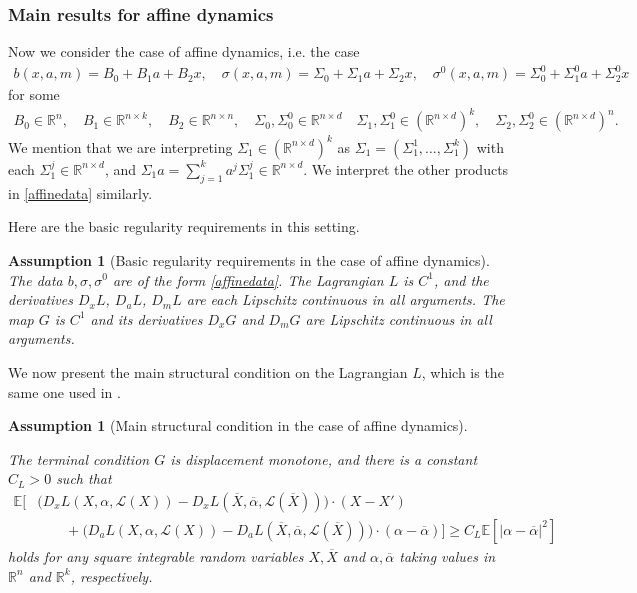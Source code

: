 \documentclass[11pt,reqno]{amsart}
\numberwithin{equation}{section}
\newtheorem{assumption}[theorem]{Assumption}
\theoremstyle{definition}
\def\E{{\mathbb E}}
\def\R{{\mathbb R}}
\newcommand{\sL}{\mathcal{L}}
\newcommand{\ov}{\overline}
\def \E{\mathbb{E}}
\def \R{\mathbb{R}}
\begin{document}
\subsubsection{Main results for affine dynamics}

Now we consider the case of affine dynamics, i.e. the case
\begin{align} \label{affinedata}
    b(x,a,m) = B_0 + B_1 a + B_2 x, \quad \sigma(x,a,m)  = \Sigma_0 + \Sigma_1 a + \Sigma_2 x, \quad \sigma^0(x,a,m) = \Sigma^0_0 + \Sigma^0_1 a + \Sigma^0_2 x
\end{align}
for some 
\begin{align*}
    B_0 \in \R^n, \quad B_1 \in \R^{n \times k}, \quad B_2 \in \R^{n \times n}, \quad \Sigma_0, \Sigma_0^0 \in \R^{n \times d} \quad \Sigma_1,\Sigma_1^0 \in (\R^{n \times d})^{k}, \quad \Sigma_2, \Sigma_2^0 \in (\R^{n \times d})^{n}.
\end{align*}
We mention that we are interpreting $\Sigma_1 \in (\R^{n \times d})^k$ as $\Sigma_1 = (\Sigma_1^1,\dots,\Sigma_1^k)$ with each $\Sigma_1^j \in \R^{n \times d}$, and $\Sigma_1 a = \sum_{j = 1}^k a^j\Sigma_1^j \in \R^{n \times d}$. We interpret the other products in \eqref{affinedata} similarly.

Here are the basic regularity requirements in this setting.

\begin{assumption}[Basic regularity requirements in the case of affine dynamics] \label{assump:affinereg}
The data $b, \sigma, \sigma^0$ are of the form \eqref{affinedata}. The Lagrangian $L$ is $C^1$, and the derivatives $D_x L$, $D_aL$, $D_mL$ are each Lipschitz continuous in all arguments. The map $G$ is $C^1$ and its derivatives $D_x G$ and $D_m G$ are Lipschitz continuous in all arguments.
\end{assumption}

We now present the main structural condition on the Lagrangian $L$, which is the same one used in \cite{Mes-Mou21}. 

\begin{assumption}[Main structural condition in the case of affine dynamics] \label{assump:affinestruct}

The terminal condition $G$ is displacement monotone, and there is a constant $C_L > 0$ such that
\begin{align} \label{affinestruct}
\E\Big[ &\Big(D_x L(X,\alpha, \sL(X)) - D_x L(\ov{X}, \ov{\alpha}, \sL(\ov{X})) \Big) \cdot (X - X') \nonumber \\
&\qquad +  \Big(D_a L(X,\alpha, \sL(X)) - D_aL(\ov{X}, \ov{\alpha}, \sL(\ov{X})) \Big) \cdot (\alpha - \ov{\alpha})  \Big] \geq C_L \E[|\alpha - \ov{\alpha}|^2]
\end{align}
holds for any square integrable random variables $X, \ov{X}$ and $\alpha, \ov{\alpha}$ taking values in $\R^n$ and $\R^k$, respectively.
\end{assumption}
\end{document}
